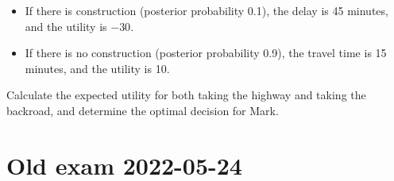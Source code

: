 \documentclass[12pt,a4paper,twoside]{article}
\begin{document}
\begin{enumerate}
\begin{enumerate}[label=\alph*)]
\begin{itemize}
        \begin{itemize}
            \item If there is construction (posterior probability 0.1), the delay is 45 minutes,
            and the utility is $-30$.
            \item If there is no construction (posterior probability 0.9), the travel time is
            15 minutes, and the utility is 10.
        \end{itemize}
    \end{itemize}
    Calculate the expected utility for both taking the highway and taking the backroad, and
    determine the optimal decision for Mark.
    \end{enumerate}
\end{enumerate}

\section{Old exam 2022-05-24}
\end{document}
